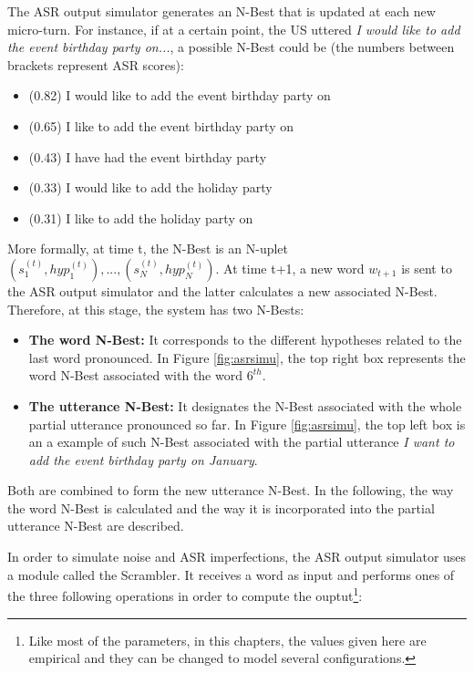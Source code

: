      	The ASR output simulator generates an N-Best that is updated at each new micro-turn. For instance, if at a certain point, the US uttered \textit{I would like to add the event birthday party on...}, a possible N-Best could be (the numbers between brackets represent ASR scores):
        
        \begin{itemize}
					\item (0.82) I would like to add the event birthday party on
					\item (0.65) I like to add the event birthday party on
					\item (0.43) I have had the event birthday party
					\item (0.33) I would like to add the holiday party
					\item (0.31) I like to add the holiday party on
        \end{itemize}
        
       	More formally, at time t, the N-Best is an N-uplet ${(s_1^{(t)},hyp_1^{(t)}),...,(s_N^{(t)},hyp_N^{(t)})}$. At time t+1, a new word $w_{t+1}$ is sent to the ASR output simulator and the latter calculates a new associated N-Best. Therefore, at this stage, the system has two N-Bests:
				
				\begin{itemize}
					\item \textbf{The word N-Best:} It corresponds to the different hypotheses related to the last word pronounced. In Figure \ref{fig:asrsimu}, the top right box represents the word N-Best associated with the word $6^{th}$.
					\item \textbf{The utterance N-Best:} It designates the N-Best associated with the whole partial utterance pronounced so far. In Figure \ref{fig:asrsimu}, the top left box is an a example of such N-Best associated with the partial utterance \textit{I want to add the event birthday party on January}.
				\end{itemize}
				
				Both are combined to form the new utterance N-Best. In the following, the way the word N-Best is calculated and the way it is incorporated into the partial utterance N-Best are described.
				
				In order to simulate noise and ASR imperfections, the ASR output simulator uses a module called the Scrambler. It receives a word as input and performs ones of the three following operations in order to compute the ouptut\footnote{Like most of the parameters, in this chapters, the values given here are empirical and they can be changed to model several configurations.}:
				
